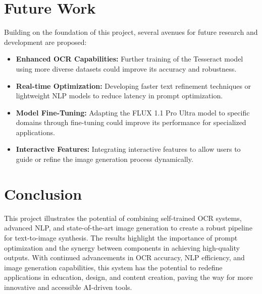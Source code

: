 \section{Future Work}
Building on the foundation of this project, several avenues for future research and development are proposed:
\begin{itemize}
    \item \textbf{Enhanced OCR Capabilities:} Further training of the Tesseract model using more diverse datasets could improve its accuracy and robustness.
    \item \textbf{Real-time Optimization:} Developing faster text refinement techniques or lightweight NLP models to reduce latency in prompt optimization.
    \item \textbf{Model Fine-Tuning:} Adapting the FLUX 1.1 Pro Ultra model to specific domains through fine-tuning could improve its performance for specialized applications.
    \item \textbf{Interactive Features:} Integrating interactive features to allow users to guide or refine the image generation process dynamically.
    \end{itemize}

\section{Conclusion}
This project illustrates the potential of combining self-trained OCR systems, advanced NLP, and state-of-the-art image generation to create a robust pipeline for text-to-image synthesis. The results highlight the importance of prompt optimization and the synergy between components in achieving high-quality outputs. With continued advancements in OCR accuracy, NLP efficiency, and image generation capabilities, this system has the potential to redefine applications in education, design, and content creation, paving the way for more innovative and accessible AI-driven tools.